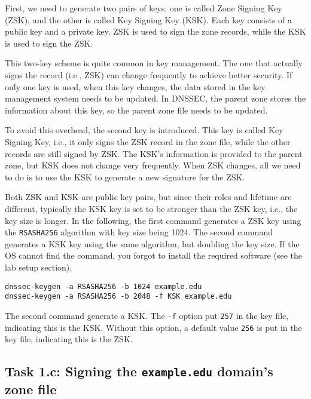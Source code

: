 First, we need to generate two pairs of keys, one is called Zone Signing Key (ZSK), and 
the other is called Key Signing Key (KSK). Each key consists of a public key and a private key.
ZSK is used to sign the zone records, while the KSK is used to sign the ZSK. 

This two-key scheme is quite common in key management. The one that actually signs the record
(i.e., ZSK) can change frequently to achieve better security. If only one key is used,
when this key changes, the data stored in the key management system needs to be updated. 
In DNSSEC, the parent zone stores the information about this key, so the parent zone file
needs to be updated. 

To avoid this overhead, the second key is introduced. This key is called 
Key Signing Key, i.e., it only signs the ZSK record in the zone file, while the 
other records are still signed by ZSK. The KSK's information is provided to 
the parent zone, but KSK does not change very frequently. When ZSK changes,
all we need to do is to use the KSK to generate a new signature for the ZSK. 

Both ZSK and KSK are public key pairs, but since their roles and lifetime are different,
typically the KSK key is set to be stronger than the ZSK key, i.e., the key size 
is longer. In the following, the first command generates a ZSK key using the 
\texttt{RSASHA256} algorithm with key size being 1024. The second command 
generates a KSK key using the same algorithm, but doubling the key size. 
If the OS cannot find the command, you forgot to 
install the required software (see the lab setup section).


\begin{lstlisting}
dnssec-keygen -a RSASHA256 -b 1024 example.edu
dnssec-keygen -a RSASHA256 -b 2048 -f KSK example.edu
\end{lstlisting}

The second command generate a KSK. The \texttt{-f} option 
put \texttt{257} in the key file, indicating this is the KSK. 
Without this option, a default value \texttt{256} is put in
the key file, indicating this is the ZSK.





\subsection{Task 1.c: Signing the \texttt{example.edu} domain's zone file} 


